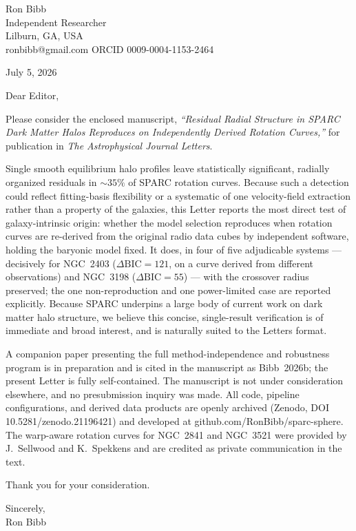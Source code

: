 \documentclass[11pt]{article, linenumbers}
\begin{document}
\noindent Ron Bibb\\
Independent Researcher\\
Lilburn, GA, USA\\
ronbibb@gmail.com \quad ORCID 0009-0004-1153-2464

\vspace{1em}
\noindent July 5, 2026

\vspace{1em}
\noindent Dear Editor,

Please consider the enclosed manuscript, \emph{``Residual Radial Structure in SPARC Dark
Matter Halos Reproduces on Independently Derived Rotation Curves,''} for publication in
\emph{The Astrophysical Journal Letters}.

Single smooth equilibrium halo profiles leave statistically significant, radially organized
residuals in ${\sim}35\%$ of SPARC rotation curves. Because such a detection could reflect
fitting-basis flexibility or a systematic of one velocity-field extraction rather than a
property of the galaxies, this Letter reports the most direct test of galaxy-intrinsic
origin: whether the model selection reproduces when rotation curves are re-derived from the
original radio data cubes by independent software, holding the baryonic model fixed. It
does, in four of five adjudicable systems --- decisively for NGC~2403
($\Delta\mathrm{BIC}=121$, on a curve derived from different observations) and NGC~3198
($\Delta\mathrm{BIC}=55$) --- with the crossover radius preserved; the one non-reproduction
and one power-limited case are reported explicitly. Because SPARC underpins a large body of
current work on dark matter halo structure, we believe this concise, single-result
verification is of immediate and broad interest, and is naturally suited to the Letters
format.

A companion paper presenting the full method-independence and robustness program is in
preparation and is cited in the manuscript as Bibb~2026b; the present Letter is fully
self-contained. The manuscript is not under consideration elsewhere, and no presubmission
inquiry was made. All code, pipeline configurations, and derived data products are openly
archived (Zenodo, DOI 10.5281/zenodo.21196421) and developed at
github.com/RonBibb/sparc-sphere. The warp-aware rotation curves for NGC~2841 and NGC~3521
were provided by J.~Sellwood and K.~Spekkens and are credited as private communication in
the text.

Thank you for your consideration.

\vspace{1.5em}
\noindent Sincerely,\\[0.5em]
Ron Bibb
\end{document}
